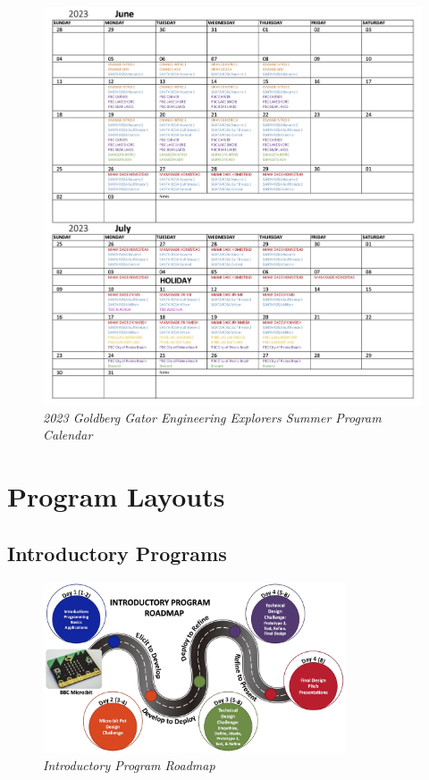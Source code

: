 \documentclass[
]{article}
\begin{document}
\begin{figure}
\centering
\includegraphics[width=1\textwidth,height=\textheight]{Images/GGEE_23_Calendar.jpg}
\caption{\emph{2023 Goldberg Gator Engineering Explorers Summer Program
Calendar}}
\end{figure}

\hypertarget{program-layouts}{%
\section{Program Layouts}\label{program-layouts}}

\hypertarget{introductory-programs}{%
\subsection{Introductory Programs}\label{introductory-programs}}

\begin{figure}
\centering
\includegraphics[width=0.8\textwidth,height=\textheight]{Images/GGEE_23_intro_roadmap.jpg}
\caption{\emph{Introductory Program Roadmap}}
\end{figure}
\end{document}
